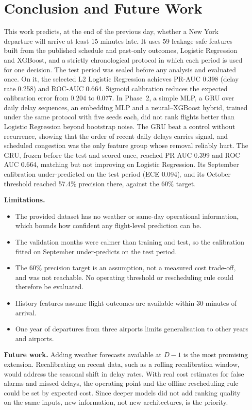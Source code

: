 \section{Conclusion and Future Work}
\label{sec:conclusion}

This work predicts, at the end of the previous day, whether a New York departure will arrive at
least 15 minutes late. It uses 59 leakage-safe features built from the published schedule and
past-only outcomes, Logistic Regression and XGBoost, and a strictly chronological protocol in
which each period is used for one decision. The test period was sealed before any analysis and
evaluated once. On it, the selected L2 Logistic Regression achieves PR-AUC 0.398 (delay rate 0.258)
and ROC-AUC 0.664. Sigmoid calibration reduces the expected calibration error from 0.204 to 0.077.
In Phase~2, a simple MLP, a GRU over daily delay sequences, an embedding MLP and a neural--XGBoost
hybrid, trained under the same protocol with five seeds each, did not rank flights better than
Logistic Regression beyond bootstrap noise. The GRU beat a control without recurrence, showing that
the order of recent daily delays carries signal, and scheduled congestion was the only feature group
whose removal reliably hurt. The GRU, frozen before the test and scored once, reached PR-AUC 0.399
and ROC-AUC 0.664, matching but not improving on Logistic Regression. Its September calibration
under-predicted on the test period (ECE 0.094), and its October threshold reached 57.4\% precision
there, against the 60\% target.

\textbf{Limitations.}
\begin{itemize}
  \item The provided dataset has no weather or same-day operational information, which bounds
  how confident any flight-level prediction can be.
  \item The validation months were calmer than training and test, so the calibration fitted on
  September under-predicts on the test period.
  \item The 60\% precision target is an assumption, not a measured cost trade-off, and was not
  reachable. No operating threshold or rescheduling rule could therefore be evaluated.
  \item History features assume flight outcomes are available within 30 minutes of arrival.
  \item One year of departures from three airports limits generalisation to other years and
  airports.
\end{itemize}

\textbf{Future work.} Adding weather forecasts available at $D{-}1$ is the most promising
extension. Recalibrating on recent data, such as a rolling recalibration window, would address the
seasonal shift in delay rates. With real cost estimates for false alarms and missed delays, the
operating point and the offline rescheduling rule could be set by expected cost. Since deeper models
did not add ranking quality on the same inputs, new information, not new architectures, is the
priority.
